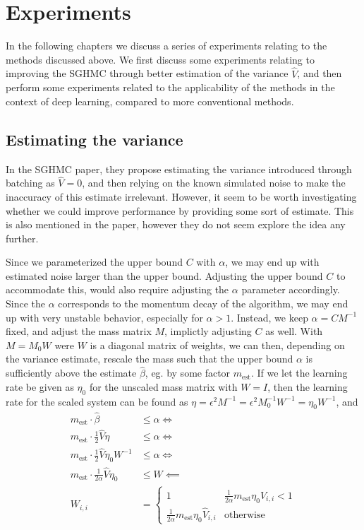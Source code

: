 \chapter{Experiments}

In the following chapters we discuss a series of experiments relating to the methods discussed above. 
We first discuss some experiments relating to improving the SGHMC through better estimation of the variance $\hat{V}$, and then perform some experiments related to the applicability of the methods in the context of deep learning, compared to more conventional methods.

\section{Estimating the variance}

In the SGHMC paper, they propose estimating the variance introduced through batching as $\hat{V}=0$, and then relying on the known simulated noise to make the inaccuracy of this estimate irrelevant. 
However, it seem to be worth investigating whether we could improve performance by providing some sort of estimate. 
This is also mentioned in the paper, however they do not seem explore the idea any further. 

Since we parameterized the upper bound $C$ with $\alpha$, we may end up with estimated noise larger than the upper bound. Adjusting the upper bound $C$ to accommodate this, would also require adjusting the $\alpha$ parameter accordingly. Since the $\alpha$ corresponds to the momentum decay of the algorithm, we may end up with very unstable behavior, especially for $\alpha > 1$. 
Instead, we keep $\alpha=CM^{-1}$ fixed, and adjust the mass matrix $M$, implictly adjusting $C$ as well.
With $M = M_0 W$ were $W$ is a diagonal matrix of weights, we can then, depending on the variance estimate, rescale the mass such that the upper bound $\alpha$ is sufficiently above the estimate $\hat\beta$, eg. by some factor $m_{\text{est}}$. If we let the learning rate be given as $\eta_0$  for the unscaled mass matrix with $W = I$, then the learning rate for the scaled system can be found as $\eta = \epsilon^2 M^{-1} = \epsilon^2 M_0^{-1}W^{-1} = \eta_0 W^{-1}$, and
\begin{align*}
    m_{\text{est}} \cdot \hat{\beta}  &\leq \alpha \Leftrightarrow\\ 
    m_{\text{est}} \cdot \frac{1}{2} \hat V \eta   &\leq \alpha \Leftrightarrow\\ 
    m_{\text{est}} \cdot \frac{1}{2} \hat V \eta_0 W^{-1}  &\leq \alpha \Leftrightarrow\\ 
    m_{\text{est}} \cdot \frac{1}{2\alpha} \hat V \eta_0   &\leq W \impliedby \\
    W_{i,i} &= \begin{cases}
        1 & \frac{1}{2\alpha}m_{\text{est}} \eta_0 \hat{V}_{i,i} < 1 \\
        \frac{1}{2\alpha}m_{\text{est}} \eta_0 \hat{V}_{i,i} & \text{otherwise}
    \end{cases}
\end{align*}

